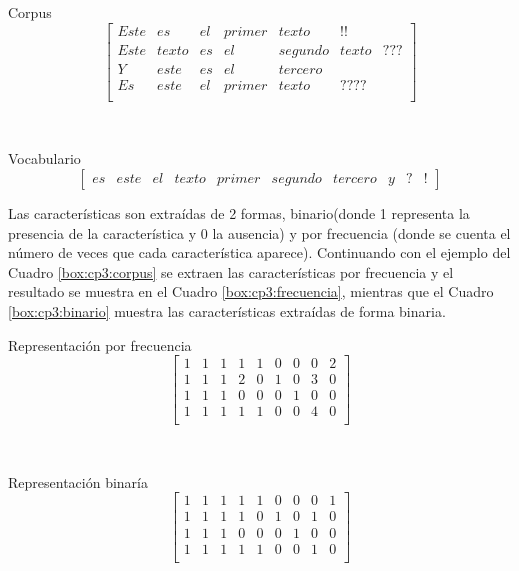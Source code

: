 \begin{mygraybox}[label={box:cp3:corpus}]{Corpus} 
\begin{equation*}
\begin{bmatrix}
Este&es&el&primer&texto&!!\\
Este&texto&es&el&segundo&texto&???\\
Y&este&es&el&tercero\\
Es&este&el&primer&texto&????\\
\end{bmatrix}
\end{equation*}
\end{mygraybox}
\ \\
\begin{mygraybox}[label={box:cp3:caracteristicas}]{Vocabulario} 
\begin{equation*}
\begin{bmatrix}
es  & este & el & texto & primer & segundo & tercero & y & ? & !
\end{bmatrix}
\end{equation*}
\end{mygraybox}

Las características son extraídas de 2 formas, binario(donde 1 representa la presencia de la característica y 0 la ausencia) y por frecuencia (donde se cuenta el número de veces que cada característica aparece). Continuando con el ejemplo del Cuadro \ref{box:cp3:corpus} se extraen las características por frecuencia y el resultado se muestra en el Cuadro \ref{box:cp3:frecuencia}, mientras que el Cuadro \ref{box:cp3:binario} muestra las características extraídas de forma binaria.\\


\begin{mygraybox}[label={box:cp3:frecuencia}]{Representación por frecuencia} 
\begin{equation*}
\begin{bmatrix}
1 & 1 & 1 & 1 & 1 & 0 & 0 & 0 & 2\\
1 & 1 & 1 & 2 & 0 & 1 & 0 & 3 & 0\\
1 & 1 & 1 & 0 & 0 & 0 & 1 & 0 & 0\\
1 & 1 & 1 & 1 & 1 & 0 & 0 & 4 & 0\\
\end{bmatrix}
\end{equation*}
\end{mygraybox}

\ \\

\begin{mygraybox}[label={box:cp3:binario}]{Representación binaría} 
\begin{equation*}
\begin{bmatrix}
1 & 1 & 1 & 1 & 1 & 0 & 0 & 0 & 1\\
1 & 1 & 1 & 1 & 0 & 1 & 0 & 1 & 0\\
1 & 1 & 1 & 0 & 0 & 0 & 1 & 0 & 0\\
1 & 1 & 1 & 1 & 1 & 0 & 0 & 1 & 0\\
\end{bmatrix}
\end{equation*}
\end{mygraybox}




